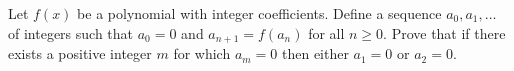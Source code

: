 Let $f(x)$ be a polynomial with integer coefficients.  Define a
sequence $a_0,a_1,\ldots$ of integers such that $a_0=0$ and
$a_{n+1}=f(a_n)$
for all $n\geq 0$.  Prove that if there exists a positive integer $m$ for
which $a_m=0$ then either $a_1=0$ or $a_2=0$.
